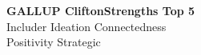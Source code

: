 \documentclass[]{deedy-resume-openfont}
\begin{document}
\begin{minipage}[t]{0.31\textwidth}

\textbf{GALLUP\textsuperscript{\textregistered} CliftonStrengths\textsuperscript{\texttrademark} Top 5}\\
Includer \textbullet{} Ideation \textbullet{} Connectedness \\
Positivity \textbullet{} Strategic \\


%
%

\end{minipage} 
\hfill
\end{document}
